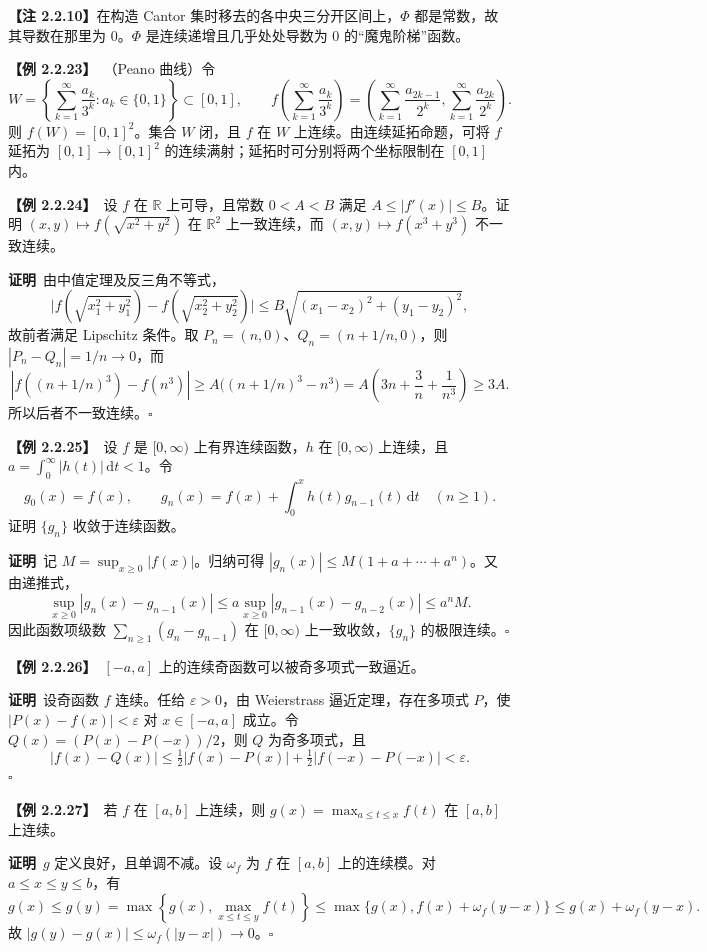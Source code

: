\documentclass[UTF8,a4paper,11pt]{ctexart}
\newcommand{\ex}[1]{\par\medskip\noindent\textbf{【例 #1】}\ }
\newcommand{\pf}{\par\noindent\textbf{证明}\ }
\begin{document}
\noindent\textbf{【注 2.2.10】}在构造 Cantor 集时移去的各中央三分开区间上，$\Phi$ 都是常数，故其导数在那里为 $0$。$\Phi$ 是连续递增且几乎处处导数为 $0$ 的“魔鬼阶梯”函数。

\ex{2.2.23}（Peano 曲线）令
\[
W=\left\{\sum_{k=1}^{\infty}\frac{a_k}{3^k}:a_k\in\{0,1\}\right\}\subset[0,1],
\qquad
f\left(\sum_{k=1}^{\infty}\frac{a_k}{3^k}\right)
=\left(\sum_{k=1}^{\infty}\frac{a_{2k-1}}{2^k},
\sum_{k=1}^{\infty}\frac{a_{2k}}{2^k}\right).
\]
则 $f(W)=[0,1]^2$。集合 $W$ 闭，且 $f$ 在 $W$ 上连续。由连续延拓命题，可将 $f$ 延拓为 $[0,1]\to[0,1]^2$ 的连续满射；延拓时可分别将两个坐标限制在 $[0,1]$ 内。

\ex{2.2.24}设 $f$ 在 $\mathbb R$ 上可导，且常数 $0<A<B$ 满足 $A\le|f'(x)|\le B$。证明 $(x,y)\mapsto f(\sqrt{x^2+y^2})$ 在 $\mathbb R^2$ 上一致连续，而 $(x,y)\mapsto f(x^3+y^3)$ 不一致连续。
\pf 由中值定理及反三角不等式，
\[
\bigl|f(\sqrt{x_1^2+y_1^2})-f(\sqrt{x_2^2+y_2^2})\bigr|
\le B\sqrt{(x_1-x_2)^2+(y_1-y_2)^2},
\]
故前者满足 Lipschitz 条件。取 $P_n=(n,0)$、$Q_n=(n+1/n,0)$，则 $|P_n-Q_n|=1/n\to0$，而
\[
|f((n+1/n)^3)-f(n^3)|
\ge A\bigl((n+1/n)^3-n^3\bigr)
=A\left(3n+\frac3n+\frac1{n^3}\right)\ge3A.
\]
所以后者不一致连续。\hfill$\square$

\ex{2.2.25}设 $f$ 是 $[0,\infty)$ 上有界连续函数，$h$ 在 $[0,\infty)$ 上连续，且 $a=\int_0^\infty|h(t)|\,\mathrm dt<1$。令
\[
g_0(x)=f(x),\qquad g_n(x)=f(x)+\int_0^x h(t)g_{n-1}(t)\,\mathrm dt\quad(n\ge1).
\]
证明 $\{g_n\}$ 收敛于连续函数。
\pf 记 $M=\sup_{x\ge0}|f(x)|$。归纳可得 $|g_n(x)|\le M(1+a+\cdots+a^n)$。又由递推式，
\[
\sup_{x\ge0}|g_n(x)-g_{n-1}(x)|
\le a\sup_{x\ge0}|g_{n-1}(x)-g_{n-2}(x)|
\le a^nM.
\]
因此函数项级数 $\sum_{n\ge1}(g_n-g_{n-1})$ 在 $[0,\infty)$ 上一致收敛，$\{g_n\}$ 的极限连续。\hfill$\square$

\ex{2.2.26}$[-a,a]$ 上的连续奇函数可以被奇多项式一致逼近。
\pf 设奇函数 $f$ 连续。任给 $\varepsilon>0$，由 Weierstrass 逼近定理，存在多项式 $P$，使 $|P(x)-f(x)|<\varepsilon$ 对 $x\in[-a,a]$ 成立。令 $Q(x)=(P(x)-P(-x))/2$，则 $Q$ 为奇多项式，且
\[
|f(x)-Q(x)|\le\tfrac12|f(x)-P(x)|+\tfrac12|f(-x)-P(-x)|<\varepsilon.
\]\hfill$\square$

\ex{2.2.27}若 $f$ 在 $[a,b]$ 上连续，则 $g(x)=\max_{a\le t\le x}f(t)$ 在 $[a,b]$ 上连续。
\pf $g$ 定义良好，且单调不减。设 $\omega_f$ 为 $f$ 在 $[a,b]$ 上的连续模。对 $a\le x\le y\le b$，有
\[
g(x)\le g(y)=\max\left\{g(x),\max_{x\le t\le y}f(t)\right\}
\le\max\{g(x),f(x)+\omega_f(y-x)\}
\le g(x)+\omega_f(y-x).
\]
故 $|g(y)-g(x)|\le\omega_f(|y-x|)\to0$。\hfill$\square$
\end{document}
